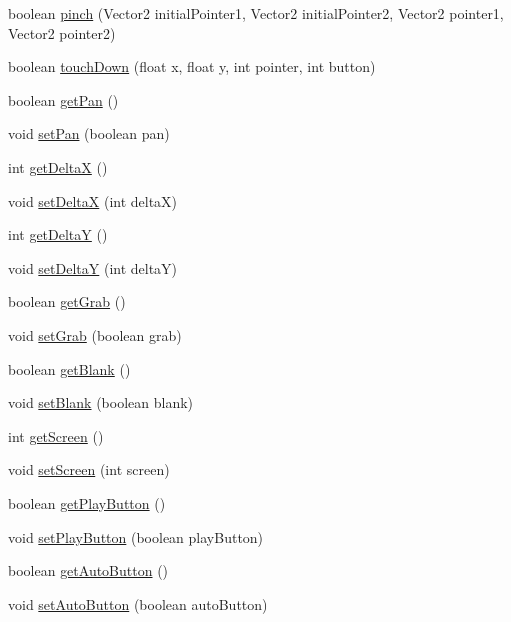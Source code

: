\begin{DoxyCompactItemize}
\item 
boolean \hyperlink{classbattle_1_1logic_1_1_gesture_handler_a9e6eb87c69604b41e0a219fda20ec05f}{pinch} (Vector2 initial\+Pointer1, Vector2 initial\+Pointer2, Vector2 pointer1, Vector2 pointer2)
\item 
boolean \hyperlink{classbattle_1_1logic_1_1_gesture_handler_a59da1f25978205d6f9de1563060f43bb}{touch\+Down} (float x, float y, int pointer, int button)
\item 
boolean \hyperlink{classbattle_1_1logic_1_1_gesture_handler_af8077dc9c9e7fc8455bbf1238fa9b9f8}{get\+Pan} ()
\item 
void \hyperlink{classbattle_1_1logic_1_1_gesture_handler_a789d5a6fd3a5f2770fde4c5823f1ea06}{set\+Pan} (boolean pan)
\item 
int \hyperlink{classbattle_1_1logic_1_1_gesture_handler_add8ac59384d859387119dde2ebcde943}{get\+Delta\+X} ()
\item 
void \hyperlink{classbattle_1_1logic_1_1_gesture_handler_a82885501864d215f69e09275c198ed4c}{set\+Delta\+X} (int delta\+X)
\item 
int \hyperlink{classbattle_1_1logic_1_1_gesture_handler_aceda192d156ed672ae9b03d46527ed08}{get\+Delta\+Y} ()
\item 
void \hyperlink{classbattle_1_1logic_1_1_gesture_handler_a713d5f8f6e1984db80fa413d06aee3a4}{set\+Delta\+Y} (int delta\+Y)
\item 
boolean \hyperlink{classbattle_1_1logic_1_1_gesture_handler_a7e41ac66955e6cc4ab7070cae9a27f63}{get\+Grab} ()
\item 
void \hyperlink{classbattle_1_1logic_1_1_gesture_handler_ad62c54efdda8d47bb64f025cbe0602d3}{set\+Grab} (boolean grab)
\item 
boolean \hyperlink{classbattle_1_1logic_1_1_gesture_handler_a6029ea6358a6843cd6b62a6671f0e068}{get\+Blank} ()
\item 
void \hyperlink{classbattle_1_1logic_1_1_gesture_handler_af50c173c7a6dc925479922fcf03dca46}{set\+Blank} (boolean blank)
\item 
int \hyperlink{classbattle_1_1logic_1_1_gesture_handler_a018f7ea6f76d276f1865b5a686d17634}{get\+Screen} ()
\item 
void \hyperlink{classbattle_1_1logic_1_1_gesture_handler_a673ce49feab8e02b4044b5eb02d07cfa}{set\+Screen} (int screen)
\item 
boolean \hyperlink{classbattle_1_1logic_1_1_gesture_handler_a775a34b7f15435d252f37d178c4aa570}{get\+Play\+Button} ()
\item 
void \hyperlink{classbattle_1_1logic_1_1_gesture_handler_aa6c4cdf047391e355b82c8ca6f930104}{set\+Play\+Button} (boolean play\+Button)
\item 
boolean \hyperlink{classbattle_1_1logic_1_1_gesture_handler_af8202dc6b31a3c651ea8b735ddae445e}{get\+Auto\+Button} ()
\item 
void \hyperlink{classbattle_1_1logic_1_1_gesture_handler_a327fab035ec9ddc832f1e73ecf00e90b}{set\+Auto\+Button} (boolean auto\+Button)
\end{DoxyCompactItemize}


